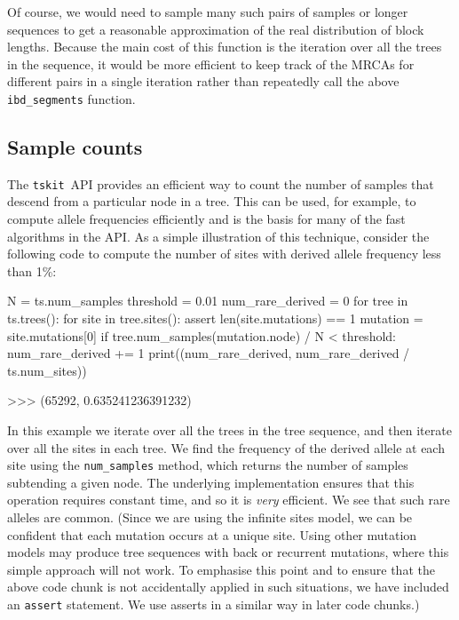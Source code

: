 \documentclass[graybox]{svmult}
\newcommand{\tskit}[0]{\texttt{tskit}}
\begin{document}
Of course, we would need to sample many such pairs of samples or longer sequences to
get a reasonable approximation of the real distribution of block lengths.
Because the main cost of this function is the iteration over all the
trees in the sequence, it would be more efficient to keep track of the MRCAs
for different pairs in a single iteration rather than repeatedly
call the above \texttt{ibd\_segments} function.

\subsection{Sample counts}\label{sample-counts}

The \tskit\ API provides an efficient way to count the number of samples that
descend from  a particular node in a tree. This can be used,
for example, to compute allele frequencies efficiently and is the basis
for many of the fast algorithms in the API. As a simple illustration of
this technique, consider the following code to compute the number of
sites with derived allele frequency less than 1\%:

\begin{pythoncode}
N = ts.num_samples
threshold = 0.01
num_rare_derived = 0
for tree in ts.trees():
    for site in tree.sites():
        assert len(site.mutations) == 1
        mutation = site.mutations[0]
        if tree.num_samples(mutation.node) / N < threshold:
            num_rare_derived += 1
print((num_rare_derived, num_rare_derived / ts.num_sites))

>>> (65292, 0.635241236391232)
\end{pythoncode}

In this example we iterate over all the trees in the tree sequence, and
then iterate over all the sites in each tree. We find the frequency
of the derived allele at each site using the \texttt{num\_samples}
method, which returns the number of samples subtending a given
node. The underlying implementation ensures that this operation requires
constant time, and so it is \emph{very} efficient. We see that such rare alleles are common.
(Since we are using the infinite sites model, we can be confident that
each mutation occurs at a unique site. Using other mutation models may produce
tree sequences with back or recurrent mutations, where this simple approach
will not work. To emphasise this point and to ensure that
the above code chunk is not accidentally applied in such situations, we have included an
\texttt{assert} statement. We use asserts in a similar way in later code chunks.)
\end{document}
